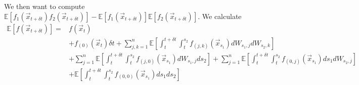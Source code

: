 \documentclass[12pt]{article}
\begin{document}
We then want to compute $\mathbb{E}[f_1(\vec{x}_{t + \delta t})f_2(\vec{x}_{t + \delta t})] - \mathbb{E}[f_1(\vec{x}_{t + \delta t})]\mathbb{E}[f_2(\vec{x}_{t + \delta t})]$.
%
We calculate
\begin{equation} 
\begin{aligned}
\mathbb{E} [f(\vec{x}_{t+\delta t})] =&
f(\vec{x}_t) \\
&+  f_{(0)}(\vec{x}_t) \delta t
+ \sum_{j, k=1}^n \mathbb{E} \left[ \int_t^{t+\delta t} \int_t^{s_2} f_{(j,k)}(\vec{x}_{s_1}) dW_{s_1, j} dW_{s_2, k} \right] \\
&+ \sum_{j=1}^n \mathbb{E} \left[ \int_t^{t+\delta t} \int_t^{s_2} f_{(j,0)}(\vec{x}_{s_1}) dW_{s_1, j} ds_2  \right]
+ \sum_{j=1}^n \mathbb{E} \left[  \int_t^{t+\delta t} \int_t^{s_2} f_{(0,j)}(\vec{x}_{s_1}) ds_1 dW_{s_2, j} \right] \\
&+ \mathbb{E} \left[ \int_t^{t+\delta t} \int_t^{s_2} f_{(0,0)}(\vec{x}_{s_1}) ds_1 ds_2  \right]
\end{aligned}
\end{equation}
%
\end{document}
